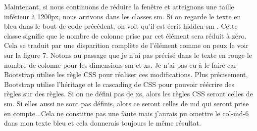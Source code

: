 \documentclass{article}
\begin{document}
Maintenant, si nous continuons de r\'eduire la fen\^etre et atteignons une taille inf\'erieur \`a 1200px, nous arrivons dans les classes sm. Si on regarde le texte en bleu dans le bout de code pr\'ec\'edent, on voit qu'il est \'ecrit \og hidden-sm \fg{}. Cette classe signifie que le nombre de colonne prise par cet \'el\'ement sera r\'eduit \`a z\'ero. Cela se traduit par une disparition compl\`ete de l'\'el\'ement comme on peux le voir sur la figure 7. Notons au passage que je n'ai pas pr\'ecis\'e dans le texte en rouge le nombre de colonne pour les dimensions sm et xs. Je n'ai pas eu \`a le faire car Bootstrap utilise les r\`egle CSS pour r\'ealiser ces modifications. Plus pr\'ecisement, Bootstrap utilise l'h\'eritage et le cascading de CSS pour pouvoir r\'e\'ecrire des r\`egles sur des r\`egles. Si on ne d\'efini pas de xs, alors les r\`egles CSS seront celles de sm. Si elles aussi ne sont pas d\'efinis, alors ce seront celles de md qui seront prise en compte...Cela ne constitue pas une faute mais j'aurais pu omettre le \og col-md-6 \fg{} dans mon texte bleu et cela donnerais toujours le m\^eme r\'esultat.\\
\end{document}

